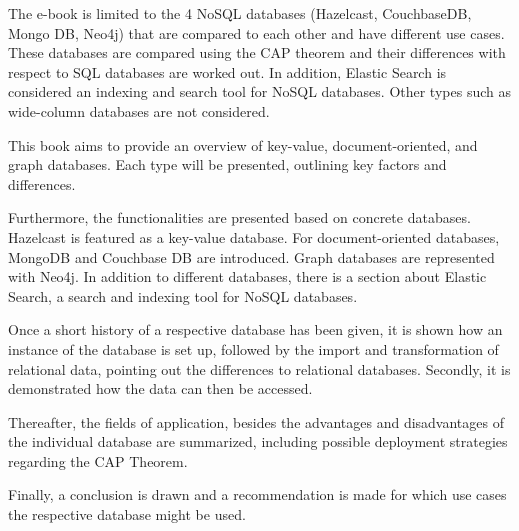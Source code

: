 The e-book is limited to the 4 \ac{NoSQL} databases (Hazelcast, CouchbaseDB, Mongo DB, Neo4j) that are compared to each other and have different use cases. These databases are compared using the \ac{CAP} theorem and their differences with respect to \ac{SQL} databases are worked out. In addition, Elastic Search is considered an indexing and search tool for \ac{NoSQL} databases. Other types such as wide-column databases are not considered.

This book aims to provide an overview of key-value, document-oriented, and graph databases. Each type will be presented, outlining key factors and differences.

Furthermore, the functionalities are presented based on concrete databases. Hazelcast is featured as a key-value database. For document-oriented databases, MongoDB and Couchbase DB are introduced. Graph databases are represented with Neo4j. In addition to different databases, there is a section about Elastic Search, a search and indexing tool for \ac{NoSQL} databases.

Once a short history of a respective database has been given, it is shown how an instance of the database is set up, followed by the import and transformation of relational data, pointing out the differences to relational databases. Secondly, it is demonstrated how the data can then be accessed.

Thereafter, the fields of application, besides the advantages and disadvantages of the individual database are summarized, including possible deployment strategies regarding the \ac{CAP} Theorem.

Finally, a conclusion is drawn and a recommendation is made for which use cases the respective database might be used.

